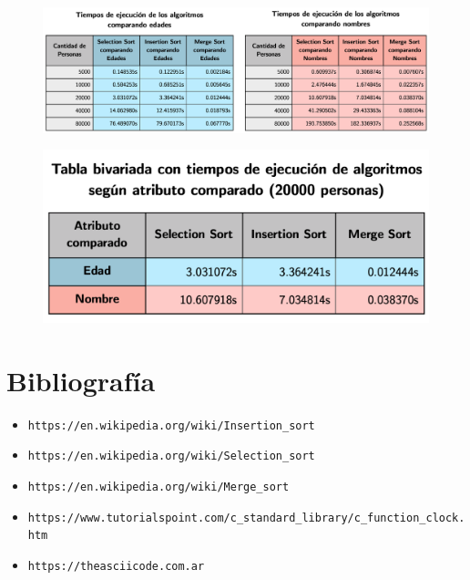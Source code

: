 \documentclass[11pt]{article}
\begin{document}
\begin{figure}[h]
    \begin{center}
        \includegraphics[scale = 0.45]{TABLAS}\par
    \end{center}
\end{figure}
\begin{figure}[h]
    \begin{center}
        \includegraphics[scale = 0.45]{TABLA_BIVARIADA}\par
    \end{center}
\end{figure}

\section{Bibliografía}
\begin{itemize}
    \item \verb|https://en.wikipedia.org/wiki/Insertion_sort|
    \item \verb|https://en.wikipedia.org/wiki/Selection_sort|
    \item \verb|https://en.wikipedia.org/wiki/Merge_sort|
    \item \verb|https://www.tutorialspoint.com/c_standard_library/c_function_clock.htm|
    \item \verb|https://theasciicode.com.ar|
\end{itemize}
\end{document}
